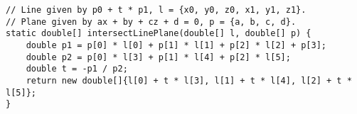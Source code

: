 \begin{verbatim}
// Line given by p0 + t * p1, l = {x0, y0, z0, x1, y1, z1}.
// Plane given by ax + by + cz + d = 0, p = {a, b, c, d}.
static double[] intersectLinePlane(double[] l, double[] p) {
	double p1 = p[0] * l[0] + p[1] * l[1] + p[2] * l[2] + p[3];
	double p2 = p[0] * l[3] + p[1] * l[4] + p[2] * l[5];
	double t = -p1 / p2;
	return new double[]{l[0] + t * l[3], l[1] + t * l[4], l[2] + t * l[5]};
}
\end{verbatim}
